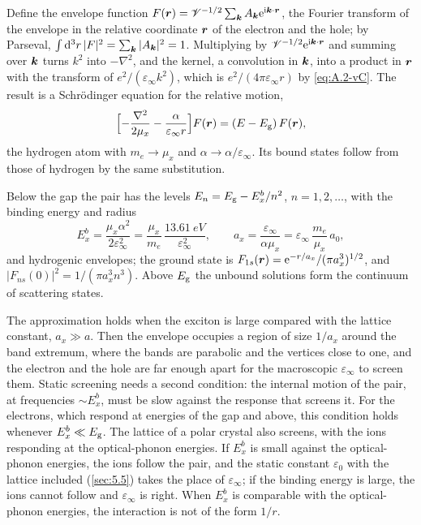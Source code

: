 Define the envelope function $F(\bm{r}) = \mathscr{V}^{-1/2}\sum_{\bm{k}}A_{\bm{k}}\mathrm{e}^{\mathrm{i}\bm{k}\cdot\bm{r}}$, the Fourier transform of the envelope in the relative coordinate $\bm{r}$ of the electron and the hole; by Parseval, $\int\mathrm{d}^3r\,|F|^2 = \sum_{\bm{k}}|A_{\bm{k}}|^2 = 1$. Multiplying by $\mathscr{V}^{-1/2}\mathrm{e}^{\mathrm{i}\bm{k}\cdot\bm{r}}$ and summing over $\bm{k}$ turns $k^2$ into $-\nabla^2$, and the kernel, a convolution in $\bm{k}$, into a product in $\bm{r}$ with the transform of $e^2/(\varepsilon_\infty k^2)$, which is $e^2/(4\pi\varepsilon_\infty r)$ by \cref{eq:A.2-vC}. The result is a Schr\"odinger equation for the relative motion,
\begin{equation}
  \Bigl[-\frac{\nabla^2}{2\mu_x} - \frac{\alpha}{\varepsilon_\infty r}\Bigr]F(\bm{r}) = (E - E_{\mathrm{g}})\,F(\bm{r}) ,
  \label{eq:4.9-envelope}
\end{equation}
the hydrogen atom with $m_e \to \mu_x$ and $\alpha \to \alpha/\varepsilon_\infty$. Its bound states follow from those of hydrogen by the same substitution.
\begin{keyresult}
Below the gap the pair has the levels $E_n = E_{\mathrm{g}} - E_x^b/n^2$, $n = 1, 2, \dots$, with the binding energy and radius
\begin{equation}
  E_x^b = \frac{\mu_x\alpha^2}{2\varepsilon_\infty^2} = \frac{\mu_x}{m_e}\,\frac{\SI{13.61}{eV}}{\varepsilon_\infty^2}, \qquad
  a_x = \frac{\varepsilon_\infty}{\alpha\mu_x} = \varepsilon_\infty\,\frac{m_e}{\mu_x}\,a_0 ,
  \label{eq:4.9-WM}
\end{equation}
and hydrogenic envelopes; the ground state is $F_{1s}(\bm{r}) = \mathrm{e}^{-r/a_x}/(\pi a_x^3)^{1/2}$, and $|F_{ns}(0)|^2 = 1/(\pi a_x^3n^3)$. Above $E_{\mathrm{g}}$ the unbound solutions form the continuum of scattering states.
\end{keyresult}
The approximation holds when the exciton is large compared with the lattice constant, $a_x \gg a$. Then the envelope occupies a region of size $1/a_x$ around the band extremum, where the bands are parabolic and the vertices close to one, and the electron and the hole are far enough apart for the macroscopic $\varepsilon_\infty$ to screen them. Static screening needs a second condition: the internal motion of the pair, at frequencies $\sim E_x^b$, must be slow against the response that screens it. For the electrons, which respond at energies of the gap and above, this condition holds whenever $E_x^b \ll E_{\mathrm{g}}$. The lattice of a polar crystal also screens, with the ions responding at the optical-phonon energies. If $E_x^b$ is small against the optical-phonon energies, the ions follow the pair, and the static constant $\varepsilon_0$ with the lattice included (\cref{sec:5.5}) takes the place of $\varepsilon_\infty$; if the binding energy is large, the ions cannot follow and $\varepsilon_\infty$ is right. When $E_x^b$ is comparable with the optical-phonon energies, the interaction is not of the form $1/r$.

